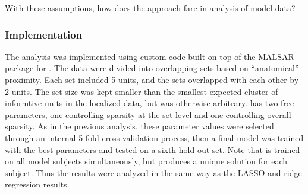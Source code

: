 %
%
%
%
%
%
%

With these assumptions, how does the approach fare in analysis of model data?

\subsubsection{Implementation} 
The \soslasso analysis was implemented using custom code built on top of the MALSAR package \cite{malsar} for \matlab. The data were divided into overlapping sets based on ``anatomical'' proximity. Each set included 5 units, and the sets overlapped with each other by 2 units. The set size was kept smaller than the smallest expected cluster of informtive units in the localized data, but was otherwise arbitrary. \soslasso has two free parameters, one controlling sparsity at the set level and one controlling overall sparsity. As in the previous analysis, these parameter values  were selected through an internal 5-fold cross-validation process, then a final model was trained with the best parameters and tested on a sixth hold-out set. Note that \soslasso is trained on all model subjects simultaneously, but produces a unique solution for each subject. Thus the results were analyzed in the same way as the LASSO and ridge regression results.

